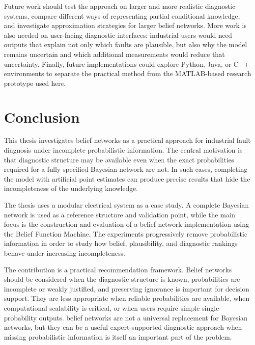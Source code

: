 \documentclass[runningheads]{llncs}
\begin{document}
Future work should test the approach on larger and more realistic diagnostic systems, compare different ways of representing partial conditional knowledge, and investigate approximation strategies for larger belief networks. More work is also needed on user-facing diagnostic interfaces: industrial users would need outputs that explain not only which faults are plausible, but also why the model remains uncertain and which additional measurements would reduce that uncertainty. Finally, future implementations could explore Python, Java, or C++ environments to separate the practical method from the MATLAB-based research prototype used here.

\section{Conclusion}
\label{sec:conclusion}

This thesis investigates belief networks as a practical approach for industrial fault diagnosis under incomplete probabilistic information. The central motivation is that diagnostic structure may be available even when the exact probabilities required for a fully specified Bayesian network are not. In such cases, completing the model with artificial point estimates can produce precise results that hide the incompleteness of the underlying knowledge.

The thesis uses a modular electrical system as a case study. A complete Bayesian network is used as a reference structure and validation point, while the main focus is the construction and evaluation of a belief-network implementation using the Belief Function Machine. The experiments progressively remove probabilistic information in order to study how belief, plausibility, and diagnostic rankings behave under increasing incompleteness.

The contribution is a practical recommendation framework. Belief networks should be considered when the diagnostic structure is known, probabilities are incomplete or weakly justified, and preserving ignorance is important for decision support. They are less appropriate when reliable probabilities are available, when computational scalability is critical, or when users require simple single-probability outputs. belief networks are not a universal replacement for Bayesian networks, but they can be a useful expert-supported diagnostic approach when missing probabilistic information is itself an important part of the problem.

\appendix
\end{document}
